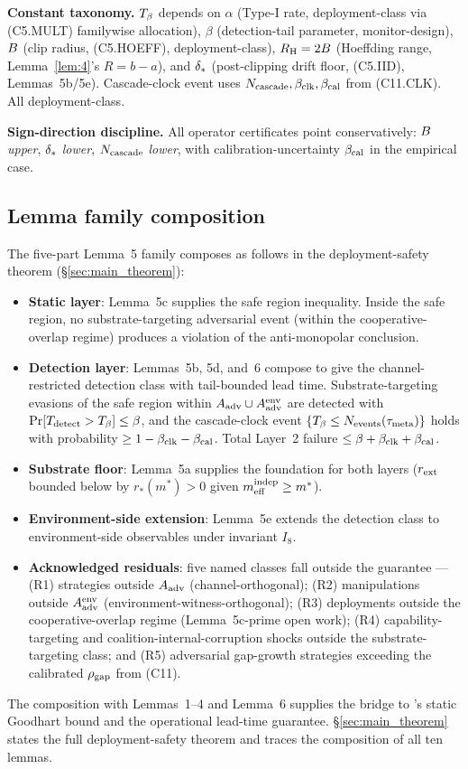\textbf{Constant taxonomy.}  $T_{\beta}$ depends on $\alpha$ (Type-I
rate, deployment-class via (C5.MULT) familywise allocation),
$\beta$ (detection-tail parameter, monitor-design), $B$ (clip
radius, (C5.HOEFF), deployment-class), $R_{\mathrm{H}} = 2B$ (Hoeffding
range, Lemma~\ref{lem:4}'s $R = b - a$), and $\delta_{*}$
(post-clipping drift floor, (C5.IID), Lemmas~5b/5e).  Cascade-clock
event uses $N_{\mathrm{cascade}}, \beta_{\mathrm{clk}}, \beta_{\mathrm{cal}}$ from (C11.CLK).  All
deployment-class.

\textbf{Sign-direction discipline.}  All operator certificates point
conservatively: $B$ \emph{upper}, $\delta_{*}$ \emph{lower},
$N_{\mathrm{cascade}}$ \emph{lower}, with calibration-uncertainty $\beta_{\mathrm{cal}}$ in the
empirical case.

\subsection{Lemma family composition}
\label{sec:lem_composition}

The five-part Lemma~5 family composes as follows in the
deployment-safety theorem (\S\ref{sec:main_theorem}):

\begin{itemize}
\item \textbf{Static layer}: Lemma~5c supplies the safe region
  inequality. Inside the safe region, no substrate-targeting
  adversarial event (within the cooperative-overlap regime)
  produces a violation of the anti-monopolar conclusion.
\item \textbf{Detection layer}: Lemmas~5b, 5d, and~6 compose to give
  the channel-restricted detection class with tail-bounded lead time.
  Substrate-targeting evasions of the safe region within $A_{\mathrm{adv}} \cup
  A_{\mathrm{adv}}^{\mathrm{env}}$ are detected with
  $\Pr[T_{\mathrm{detect}} > T_{\beta}] \leq \beta$, and the
  cascade-clock event $\{T_{\beta} \leq N_{\mathrm{events}}(\tau_{\mathrm{meta}})\}$
  holds with probability $\geq 1 - \beta_{\mathrm{clk}} - \beta_{\mathrm{cal}}$.  Total Layer~2
  failure $\leq \beta + \beta_{\mathrm{clk}} + \beta_{\mathrm{cal}}$.
\item \textbf{Substrate floor}: Lemma~5a supplies the foundation
  for both layers ($r_{\mathrm{ext}}$ bounded below by $r_*(m^*) > 0$ given
  $m_{\mathrm{eff}}^{\mathrm{indep}} \geq m^*$).
\item \textbf{Environment-side extension}: Lemma~5e extends the
  detection class to environment-side observables under invariant
  $I_8$.
\item \textbf{Acknowledged residuals}: five named classes fall
  outside the guarantee --- (R1) strategies outside $A_{\mathrm{adv}}$
  (channel-orthogonal); (R2) manipulations outside
  $A_{\mathrm{adv}}^{\mathrm{env}}$ (environment-witness-orthogonal);
  (R3) deployments outside the cooperative-overlap regime
  (Lemma~5c-prime open work); (R4) capability-targeting and
  coalition-internal-corruption shocks outside the
  substrate-targeting class; and (R5) adversarial gap-growth
  strategies exceeding the calibrated $\rho_{\mathrm{gap}}$ from (C11).
\end{itemize}

The composition with Lemmas~1--4 and Lemma~6 supplies the bridge
to \citep[Microfoundation]{lasser2026micro}'s static Goodhart bound
and the operational lead-time guarantee.
\S\ref{sec:main_theorem} states the full deployment-safety
theorem and traces the composition of all ten lemmas.
